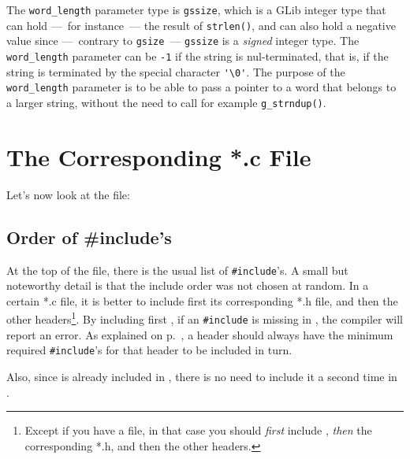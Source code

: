 The \lstinline{word_length} parameter type is \lstinline{gssize}, which is a GLib integer type that can hold ---~for instance~--- the result of \lstinline{strlen()}, and can also hold a negative value since ---~contrary to \lstinline{gsize}~--- \lstinline{gssize} is a \emph{signed} integer type. The \lstinline{word_length} parameter can be \lstinline{-1} if the string is nul-terminated, that is, if the string is terminated by the special character \lstinline{'\0'}. The purpose of the \lstinline{word_length} parameter is to be able to pass a pointer to a word that belongs to a larger string, without the need to call for example \lstinline{g_strndup()}.

\section{The Corresponding *.c File}

Let's now look at the  file:

\vspace{0.7cm}


\subsection{Order of \#include's}
At the top of the file, there is the usual list of \lstinline{#include}'s. A small but noteworthy detail is that the include order was not chosen at random. In a certain *.c file, it is better to include first its corresponding *.h file, and then the other headers\footnote{Except if you have a  file, in that case you should \emph{first} include , \emph{then} the corresponding *.h, and then the other headers.}. By including first , if an \lstinline{#include} is missing in , the compiler will report an error. As explained on p.~\pageref{oop-semi-include-in-header}, a header should always have the minimum required \lstinline{#include}'s for that header to be included in turn.

Also, since  is already included in , there is no need to include it a second time in .

